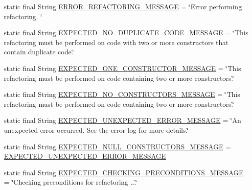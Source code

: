 \begin{DoxyCompactItemize}
\item 
static final String \hyperlink{classedu_1_1illinois_1_1canistelCassabanana_1_1tests_1_1RemoveDuplicateCodeInConstructorsRefactoringTests_a71a84052abdcc1a08c65b55f0a830b7b}{ERROR\_\-REFACTORING\_\-MESSAGE} = \char`\"{}Error performing refactoring. \char`\"{}
\item 
static final String \hyperlink{classedu_1_1illinois_1_1canistelCassabanana_1_1tests_1_1RemoveDuplicateCodeInConstructorsRefactoringTests_aac8a1c650f75e8dbac2dcd28cfe09d20}{EXPECTED\_\-NO\_\-DUPLICATE\_\-CODE\_\-MESSAGE} = \char`\"{}This refactoring must be performed on code with two or more constructors that contain duplicate code.\char`\"{}
\item 
static final String \hyperlink{classedu_1_1illinois_1_1canistelCassabanana_1_1tests_1_1RemoveDuplicateCodeInConstructorsRefactoringTests_a6d44de9379cb26439ffd7e2ff29e5874}{EXPECTED\_\-ONE\_\-CONSTRUCTOR\_\-MESSAGE} = \char`\"{}This refactoring must be performed on code containing two or more constructors.\char`\"{}
\item 
static final String \hyperlink{classedu_1_1illinois_1_1canistelCassabanana_1_1tests_1_1RemoveDuplicateCodeInConstructorsRefactoringTests_ab3af05be15455583ceda71e6a6587049}{EXPECTED\_\-NO\_\-CONSTRUCTORS\_\-MESSAGE} = \char`\"{}This refactoring must be performed on code containing two or more constructors.\char`\"{}
\item 
static final String \hyperlink{classedu_1_1illinois_1_1canistelCassabanana_1_1tests_1_1RemoveDuplicateCodeInConstructorsRefactoringTests_aefdabf6f4f74c8e0866595aee2f9aa4f}{EXPECTED\_\-UNEXPECTED\_\-ERROR\_\-MESSAGE} = \char`\"{}An unexpected error occurred. See the error log for more details.\char`\"{}
\item 
static final String \hyperlink{classedu_1_1illinois_1_1canistelCassabanana_1_1tests_1_1RemoveDuplicateCodeInConstructorsRefactoringTests_a1a017b7b7c8607561e8f93423b10b0e0}{EXPECTED\_\-NULL\_\-CONSTRUCTORS\_\-MESSAGE} = \hyperlink{classedu_1_1illinois_1_1canistelCassabanana_1_1tests_1_1RemoveDuplicateCodeInConstructorsRefactoringTests_aefdabf6f4f74c8e0866595aee2f9aa4f}{EXPECTED\_\-UNEXPECTED\_\-ERROR\_\-MESSAGE}
\item 
static final String \hyperlink{classedu_1_1illinois_1_1canistelCassabanana_1_1tests_1_1RemoveDuplicateCodeInConstructorsRefactoringTests_a734c5cd6b9cd1e88c2ab61ae597d66a8}{EXPECTED\_\-CHECKING\_\-PRECONDITIONS\_\-MESSAGE} = \char`\"{}Checking preconditions for refactoring ...\char`\"{}

\end{DoxyCompactItemize}
